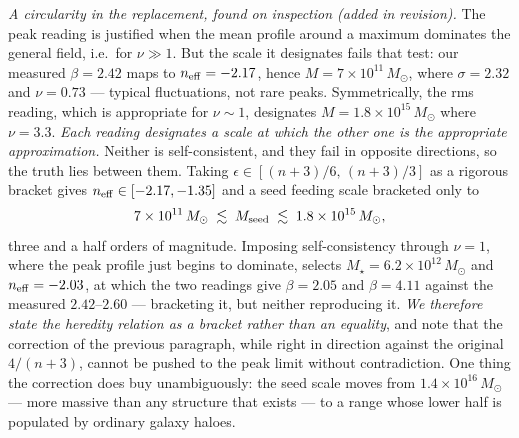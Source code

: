\documentclass[11pt]{article}
\begin{document}
\emph{A circularity in the replacement, found on inspection (added in revision).} The peak
reading is justified when the mean profile around a maximum dominates the general field, i.e.\ for
$\nu \gg 1$. But the scale it designates fails that test: our measured $\beta = 2.42$ maps to
$n_{\rm eff} = -2.17$, hence $M = 7\times10^{11}\,M_\odot$, where $\sigma = 2.32$ and
$\nu = 0.73$ --- typical fluctuations, not rare peaks. Symmetrically, the rms reading, which is
appropriate for $\nu \sim 1$, designates $M = 1.8\times10^{15}\,M_\odot$ where $\nu = 3.3$.
\emph{Each reading designates a scale at which the other one is the appropriate approximation.}
Neither is self-consistent, and they fail in opposite directions, so the truth lies between them.
Taking $\epsilon \in [(n+3)/6,\,(n+3)/3]$ as a rigorous bracket gives
$n_{\rm eff} \in [-2.17, -1.35]$ and a seed feeding scale bracketed only to
\[
7\times10^{11}\,M_\odot \;\lesssim\; M_{\rm seed} \;\lesssim\; 1.8\times10^{15}\,M_\odot ,
\]
three and a half orders of magnitude. Imposing self-consistency through $\nu = 1$, where the peak
profile just begins to dominate, selects $M_\star = 6.2\times10^{12}\,M_\odot$ and
$n_{\rm eff} = -2.03$, at which the two readings give $\beta = 2.05$ and $\beta = 4.11$ against the
measured $2.42$--$2.60$ --- bracketing it, but neither reproducing it. \emph{We therefore state the
heredity relation as a bracket rather than an equality}, and note that the correction of the
previous paragraph, while right in direction against the original $4/(n+3)$, cannot be pushed to
the peak limit without contradiction. One thing the correction does buy unambiguously: the seed
scale moves from $1.4\times10^{16}\,M_\odot$ --- more massive than any structure that exists --- to
a range whose lower half is populated by ordinary galaxy haloes.
\end{document}
